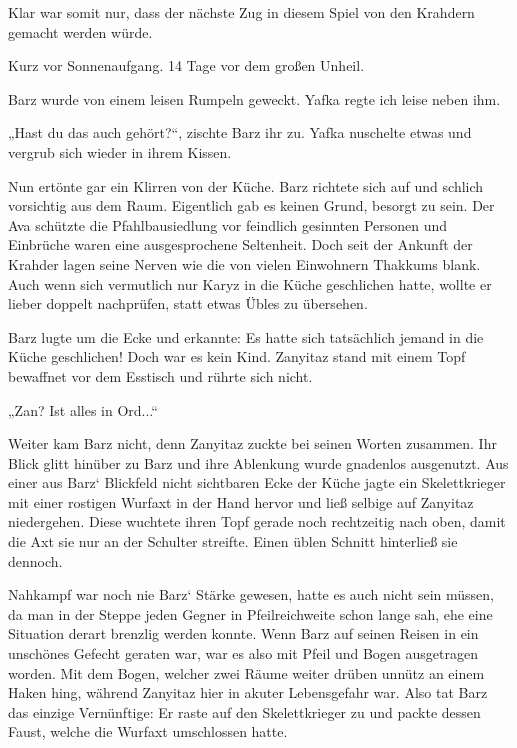 Klar war somit nur, dass der nächste Zug in diesem Spiel von den Krahdern gemacht werden würde.



\trennzeichen



Kurz vor Sonnenaufgang. 14 Tage vor dem großen Unheil.\bigskip



Barz wurde von einem leisen Rumpeln geweckt. Yafka regte ich leise neben ihm.

„Hast du das auch gehört?“, zischte Barz ihr zu. Yafka nuschelte etwas und vergrub sich wieder in ihrem Kissen.

Nun ertönte gar ein Klirren von der Küche. Barz richtete sich auf und schlich vorsichtig aus dem Raum. Eigentlich gab es keinen Grund, besorgt zu sein. Der Ava schützte die Pfahlbausiedlung vor feindlich gesinnten Personen und Einbrüche waren eine ausgesprochene Seltenheit. Doch seit der Ankunft der Krahder lagen seine Nerven wie die von vielen Einwohnern Thakkums blank. Auch wenn sich vermutlich nur Karyz in die Küche geschlichen hatte, wollte er lieber doppelt nachprüfen, statt etwas Übles zu übersehen.

Barz lugte um die Ecke und erkannte: Es hatte sich tatsächlich jemand in die Küche geschlichen! Doch war es kein Kind. Zanyitaz stand mit einem Topf bewaffnet vor dem Esstisch und rührte sich nicht.

„Zan? Ist alles in Ord...“

Weiter kam Barz nicht, denn Zanyitaz zuckte bei seinen Worten zusammen. Ihr Blick glitt hinüber zu Barz und ihre Ablenkung wurde gnadenlos ausgenutzt. Aus einer aus Barz‘ Blickfeld nicht sichtbaren Ecke der Küche jagte ein Skelettkrieger mit einer rostigen Wurfaxt in der Hand hervor und ließ selbige auf Zanyitaz niedergehen. Diese wuchtete ihren Topf gerade noch rechtzeitig nach oben, damit die Axt sie nur an der Schulter streifte. Einen üblen Schnitt hinterließ sie dennoch.

Nahkampf war noch nie Barz‘ Stärke gewesen, hatte es auch nicht sein müssen, da man in der Steppe jeden Gegner in Pfeilreichweite schon lange sah, ehe eine Situation derart brenzlig werden konnte. Wenn Barz auf seinen Reisen in ein unschönes Gefecht geraten war, war es also mit Pfeil und Bogen ausgetragen worden. Mit dem Bogen, welcher zwei Räume weiter drüben unnütz an einem Haken hing, während Zanyitaz hier in akuter Lebensgefahr war. Also tat Barz das einzige Vernünftige: Er raste auf den Skelettkrieger zu und packte dessen Faust, welche die Wurfaxt umschlossen hatte.

